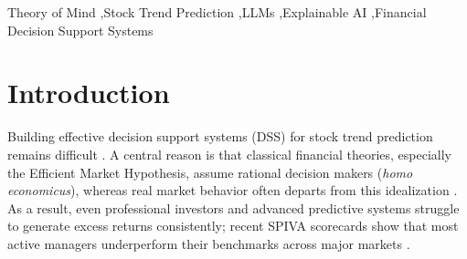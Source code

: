 \documentclass[a4paper,fleqn,doubleblind]{cas-sc}
\newcommand{\ApplyManuscriptSpacing}{%
  \setstretch{1.6}%
  \setdisplayskipstretch{0.5}
  \selectfont
}
\begin{document}



\begin{keywords}
Theory of Mind \sep Stock Trend Prediction \sep LLMs \sep Explainable AI \sep Financial Decision Support Systems
\end{keywords}

\maketitle
\ApplyManuscriptSpacing

\section{Introduction}\label{sec:introduction}
Building effective decision support systems (DSS) for stock trend prediction remains difficult \citep{hagenau2013automated,du2024explainable, liu2024multimodal}. A central reason is that classical financial theories, especially the Efficient Market Hypothesis, assume rational decision makers (\textit{homo economicus}), whereas real market behavior often departs from this idealization \citep{fama1970efficient, shiller2003efficient}. As a result, even professional investors and advanced predictive systems struggle to generate excess returns consistently; recent SPIVA scorecards show that most active managers underperform their benchmarks across major markets \citep{fama2010luck, spivaglobal2024}. 
\end{document}
